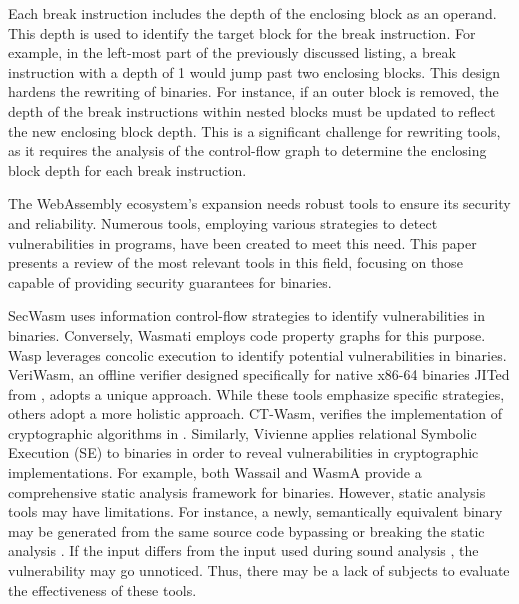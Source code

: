 

Each break instruction includes the depth of the enclosing block as an operand. 
This depth is used to identify the target block for the break instruction. 
For example, in the left-most part of the previously discussed listing, a break instruction with a depth of 1 would jump past two enclosing blocks.
This design hardens the rewriting of \Wasm binaries.
For instance, if an outer block is removed, the depth of the break instructions within nested blocks must be updated to reflect the new enclosing block depth.
This is a significant challenge for rewriting tools, as it requires the analysis of the control-flow graph to determine the enclosing block depth for each break instruction.

\label{background:wasm:analysis}

The WebAssembly ecosystem's expansion needs robust tools to ensure its security and reliability. 
Numerous tools, employing various strategies to detect vulnerabilities in \Wasm programs, have been created to meet this need. 
This paper presents a review of the most relevant tools in this field, focusing on those capable of providing security guarantees for \Wasm binaries.

 SecWasm\cite{secwasm} uses information control-flow strategies to identify vulnerabilities in \Wasm binaries. 
Conversely, Wasmati\cite{wasmati} employs code property graphs for this purpose. 
Wasp\cite{Wasp} leverages concolic execution to identify potential vulnerabilities in \Wasm binaries. 
VeriWasm\cite{veriwasm}, an offline verifier designed specifically for native x86-64 binaries JITed from \Wasm, adopts a unique approach. 
While these tools emphasize specific strategies, others adopt a more holistic approach. 
CT-Wasm\cite{ctwasm}, verifies the implementation of cryptographic algorithms in \Wasm. 
Similarly, Vivienne applies relational Symbolic Execution (SE) to \Wasm binaries in order to reveal vulnerabilities in cryptographic implementations\cite{Vivienne}. 
For example, both Wassail\cite{wassail} and WasmA\cite{WasmA} provide a comprehensive static analysis framework for \Wasm binaries. 
However, static analysis tools may have limitations. 
For instance, a newly, semantically equivalent \Wasm binary may be generated from the same source code bypassing or breaking the static analysis \cite{breaking example}.
If the \Wasm input differs from the input used during sound analysis \cite{sound_analysis}, the vulnerability may go unnoticed. 
Thus, there may be a lack of subjects to evaluate the effectiveness of these tools.

